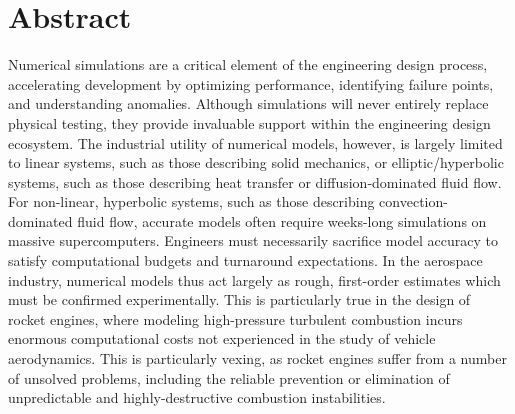 \chapter{Abstract}

Numerical simulations are a critical element of the engineering design process, accelerating development by optimizing performance, identifying failure points, and understanding anomalies. Although simulations will never entirely replace physical testing, they provide invaluable support within the engineering design ecosystem. The industrial utility of numerical models, however, is largely limited to linear systems, such as those describing solid mechanics, or elliptic/hyperbolic systems, such as those describing heat transfer or diffusion-dominated fluid flow. For non-linear, hyperbolic systems, such as those describing convection-dominated fluid flow, accurate models often require weeks-long simulations on massive supercomputers. Engineers must necessarily sacrifice model accuracy to satisfy computational budgets and turnaround expectations. In the aerospace industry, numerical models thus act largely as rough, first-order estimates which must be confirmed experimentally. This is particularly true in the design of rocket engines, where modeling high-pressure turbulent combustion incurs enormous computational costs not experienced in the study of vehicle aerodynamics. This is particularly vexing, as rocket engines suffer from a number of unsolved problems, including the reliable prevention or elimination of unpredictable and highly-destructive combustion instabilities.